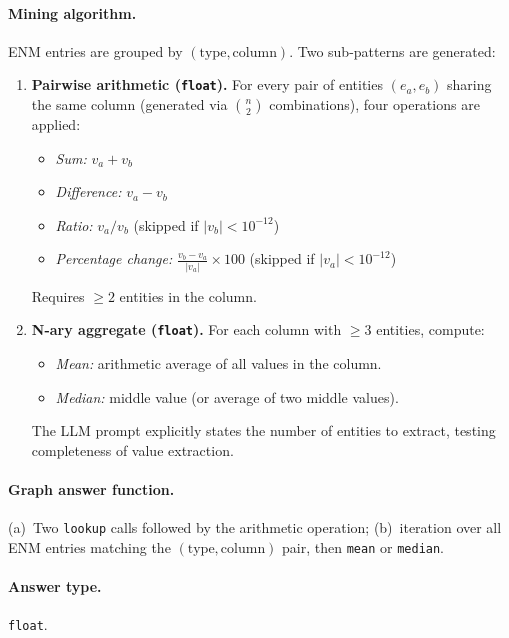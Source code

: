 \documentclass[11pt]{article}
\begin{document}
\paragraph{Mining algorithm.}
ENM entries are grouped by $(\text{type}, \text{column})$.  Two
sub-patterns are generated:

\begin{enumerate}[leftmargin=2em, label=(\alph*)]
  \item \textbf{Pairwise arithmetic (\texttt{float}).}
    For every pair of entities $(e_a, e_b)$ sharing the same column
    (generated via $\binom{n}{2}$ combinations), four operations are
    applied:
    \begin{itemize}[leftmargin=1.5em]
      \item \emph{Sum:} $v_a + v_b$
      \item \emph{Difference:} $v_a - v_b$
      \item \emph{Ratio:} $v_a / v_b$ (skipped if $|v_b| < 10^{-12}$)
      \item \emph{Percentage change:} $\frac{v_b - v_a}{|v_a|} \times 100$
        (skipped if $|v_a| < 10^{-12}$)
    \end{itemize}
    Requires $\geq 2$ entities in the column.

  \item \textbf{N-ary aggregate (\texttt{float}).}
    For each column with $\geq 3$ entities, compute:
    \begin{itemize}[leftmargin=1.5em]
      \item \emph{Mean:} arithmetic average of all values in the column.
      \item \emph{Median:} middle value (or average of two middle values).
    \end{itemize}
    The LLM prompt explicitly states the number of entities to extract,
    testing completeness of value extraction.
\end{enumerate}

\paragraph{Graph answer function.}
(a)~Two \texttt{lookup} calls followed by the arithmetic operation;
(b)~iteration over all ENM entries matching the $(\text{type},
\text{column})$ pair, then \texttt{mean} or \texttt{median}.

\paragraph{Answer type.} \texttt{float}.
\end{document}
